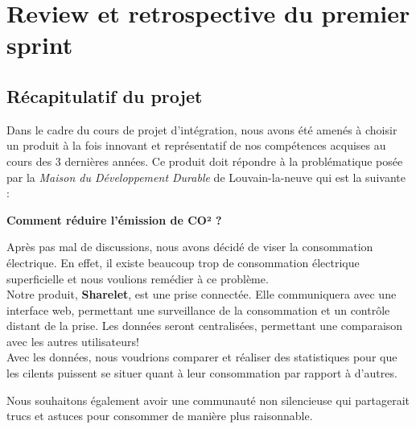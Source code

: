 \chapter{Review et retrospective du premier sprint}

\section{Récapitulatif du projet}

Dans le cadre du cours de projet d'intégration, nous avons été amenés à choisir un produit à la fois innovant et représentatif de nos compétences acquises au cours des 3 dernières années. Ce produit doit répondre à la problématique posée par la  \textit{Maison du Développement Durable} de Louvain-la-neuve qui est la suivante : 
\begin{center}
\textbf{Comment réduire l'émission de CO² ?}
\end{center}

Après pas mal de discussions, nous avons décidé de viser la consommation électrique. En effet, il existe beaucoup trop de consommation électrique superficielle et nous voulions remédier à ce problème. \\


Notre produit, \textbf{Sharelet}, est une prise connectée. Elle communiquera avec une interface web, permettant une surveillance de la consommation et un contrôle distant de la prise. Les données seront centralisées, permettant une comparaison avec les autres utilisateurs!  \\ 

Avec les données, nous voudrions comparer et réaliser des statistiques pour que les cilents puissent se situer quant à leur consommation par rapport à d'autres. 

Nous souhaitons également avoir une communauté non silencieuse qui partagerait trucs et astuces pour consommer de manière plus raisonnable. 

\newpage
